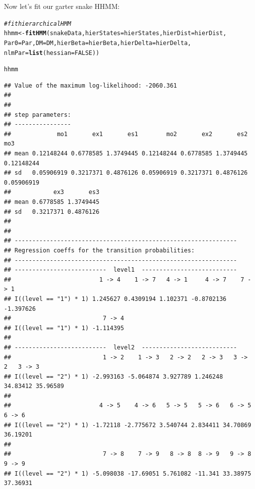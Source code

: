 \documentclass[12pt]{article}\usepackage[]{graphicx}\usepackage[]{color}
\makeatletter
\newcommand{\hlnum}[1]{\textcolor[rgb]{0.686,0.059,0.569}{#1}}%
\newcommand{\hlcom}[1]{\textcolor[rgb]{0.678,0.584,0.686}{\textit{#1}}}%
\newcommand{\hlstd}[1]{\textcolor[rgb]{0.345,0.345,0.345}{#1}}%
\newcommand{\hlkwb}[1]{\textcolor[rgb]{0.69,0.353,0.396}{#1}}%
\newcommand{\hlkwc}[1]{\textcolor[rgb]{0.333,0.667,0.333}{#1}}%
\newcommand{\hlkwd}[1]{\textcolor[rgb]{0.737,0.353,0.396}{\textbf{#1}}}%
\newenvironment{kframe}{%
 \def\at@end@of@kframe{}%
 \ifinner\ifhmode%
  \def\at@end@of@kframe{\end{minipage}}%
  \begin{minipage}{\columnwidth}%
 \fi\fi%
 \def\FrameCommand##1{\hskip\@totalleftmargin \hskip-\fboxsep
 \colorbox{shadecolor}{##1}\hskip-\fboxsep
     \hskip-\linewidth \hskip-\@totalleftmargin \hskip\columnwidth}%
 \MakeFramed {\advance\hsize-\width
   \@totalleftmargin\z@ \linewidth\hsize
   \@setminipage}}%
 {\par\unskip\endMakeFramed%
 \at@end@of@kframe}
\newenvironment{knitrout}{}{} %
\makeatother
\begin{document}
Now let's fit our garter snake HHMM:
\begin{knitrout}
\color{fgcolor}\begin{kframe}
\begin{alltt}
\hlcom{# fit hierarchical HMM}
\hlstd{hhmm} \hlkwb{<-} \hlkwd{fitHMM}\hlstd{(snakeData,}\hlkwc{hierStates}\hlstd{=hierStates,}\hlkwc{hierDist}\hlstd{=hierDist,}
               \hlkwc{Par0}\hlstd{=Par,}\hlkwc{DM}\hlstd{=DM,}\hlkwc{hierBeta}\hlstd{=hierBeta,}\hlkwc{hierDelta}\hlstd{=hierDelta,}
               \hlkwc{nlmPar}\hlstd{=}\hlkwd{list}\hlstd{(}\hlkwc{hessian}\hlstd{=}\hlnum{FALSE}\hlstd{))}
\end{alltt}
\end{kframe}
\end{knitrout}
\begin{knitrout}
\color{fgcolor}\begin{kframe}
\begin{alltt}
\hlstd{hhmm}
\end{alltt}
\begin{verbatim}
## Value of the maximum log-likelihood: -2060.361 
## 
## 
## step parameters:
## ----------------
##             mo1       ex1       es1        mo2       ex2       es2        mo3
## mean 0.12148244 0.6778585 1.3749445 0.12148244 0.6778585 1.3749445 0.12148244
## sd   0.05906919 0.3217371 0.4876126 0.05906919 0.3217371 0.4876126 0.05906919
##            ex3       es3
## mean 0.6778585 1.3749445
## sd   0.3217371 0.4876126
## 
## 
## ---------------------------------------------------------------
## Regression coeffs for the transition probabilities:
## ---------------------------------------------------------------
## --------------------------  level1  ---------------------------
##                         1 -> 4    1 -> 7   4 -> 1     4 -> 7    7 -> 1
## I((level == "1") * 1) 1.245627 0.4309194 1.102371 -0.8702136 -1.397626
##                          7 -> 4
## I((level == "1") * 1) -1.114395
## 
## --------------------------  level2  ---------------------------
##                          1 -> 2    1 -> 3   2 -> 2   2 -> 3   3 -> 2   3 -> 3
## I((level == "2") * 1) -2.993163 -5.064874 3.927789 1.246248 34.83412 35.96589
## 
##                         4 -> 5    4 -> 6   5 -> 5   5 -> 6   6 -> 5   6 -> 6
## I((level == "2") * 1) -1.72118 -2.775672 3.540744 2.834411 34.70869 36.19201
## 
##                          7 -> 8    7 -> 9   8 -> 8  8 -> 9   9 -> 8   9 -> 9
## I((level == "2") * 1) -5.098038 -17.69051 5.761082 -11.341 33.38975 37.36931

\end{verbatim}
\end{kframe}
\end{knitrout}
\end{document}
